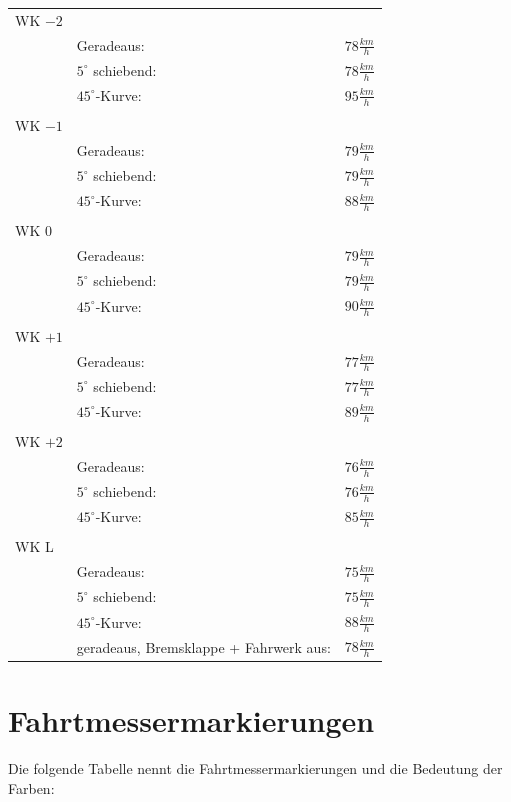 \begin{tabular}{l l l}
WK $-2$ & & \\
& Geradeaus: & $78\frac{km}{h}$\\
& $5^{\circ}$ schiebend: & $78\frac{km}{h}$\\
& $45^{\circ}$-Kurve: & $95\frac{km}{h}$\\
\hline
& &  \\
WK $-1$ & & \\
& Geradeaus: & $79\frac{km}{h}$\\
& $5^{\circ}$ schiebend: & $79\frac{km}{h}$\\
& $45^{\circ}$-Kurve: & $88\frac{km}{h}$\\
\hline
& &  \\
WK $0$ & & \\
& Geradeaus: & $79\frac{km}{h}$\\
& $5^{\circ}$ schiebend: & $79\frac{km}{h}$\\
& $45^{\circ}$-Kurve: & $90\frac{km}{h}$\\
\hline
& &  \\
WK $+1$ & & \\
& Geradeaus: & $77\frac{km}{h}$\\
& $5^{\circ}$ schiebend: & $77\frac{km}{h}$\\
& $45^{\circ}$-Kurve: & $89\frac{km}{h}$\\
\hline
 & & \\
WK $+2$ & & \\
& Geradeaus: & $76\frac{km}{h}$\\
& $5^{\circ}$ schiebend: & $76\frac{km}{h}$\\
& $45^{\circ}$-Kurve: & $85\frac{km}{h}$\\
\hline
& &  \\
WK L& & \\
& Geradeaus: & $75\frac{km}{h}$\\
& $5^{\circ}$ schiebend: & $75\frac{km}{h}$\\
& $45^{\circ}$-Kurve: & $88\frac{km}{h}$\\
& geradeaus, Bremsklappe + Fahrwerk aus: & $78\frac{km}{h}$ \\
\end{tabular}
\section{Fahrtmessermarkierungen}
Die folgende Tabelle nennt die Fahrtmessermarkierungen und die Bedeutung der Farben:\\

